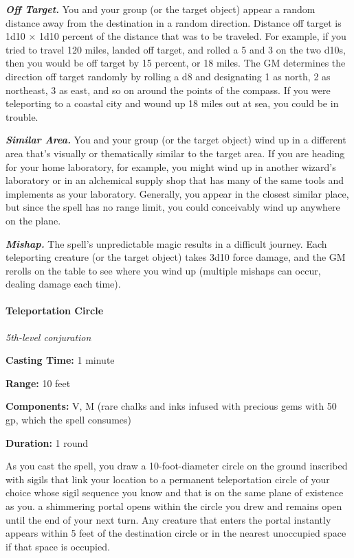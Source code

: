 \documentclass[
]{article}
\begin{document}
\emph{\textbf{Off Target.}} You and your group (or the target object)
appear a random distance away from the destination in a random
direction. Distance off target is 1d10 × 1d10 percent of the distance
that was to be traveled. For example, if you tried to travel 120 miles,
landed off target, and rolled a 5 and 3 on the two d10s, then you would
be off target by 15 percent, or 18 miles. The GM determines the
direction off target randomly by rolling a d8 and designating 1 as
north, 2 as northeast, 3 as east, and so on around the points of the
compass. If you were teleporting to a coastal city and wound up 18 miles
out at sea, you could be in trouble.

\emph{\textbf{Similar Area.}} You and your group (or the target object)
wind up in a different area that's visually or thematically similar to
the target area. If you are heading for your home laboratory, for
example, you might wind up in another wizard's laboratory or in an
alchemical supply shop that has many of the same tools and implements as
your laboratory. Generally, you appear in the closest similar place, but
since the spell has no range limit, you could conceivably wind up
anywhere on the plane.

\emph{\textbf{Mishap.}} The spell's unpredictable magic results in a
difficult journey. Each teleporting creature (or the target object)
takes 3d10 force damage, and the GM rerolls on the table to see where
you wind up (multiple mishaps can occur, dealing damage each time).

\hypertarget{teleportation-circle}{%
\paragraph{Teleportation Circle}\label{teleportation-circle}}

\emph{5th-level conjuration}

\textbf{Casting Time:} 1 minute

\textbf{Range:} 10 feet

\textbf{Components:} V, M (rare chalks and inks infused with precious
gems with 50 gp, which the spell consumes)

\textbf{Duration:} 1 round

As you cast the spell, you draw a 10-foot-diameter circle on the ground
inscribed with sigils that link your location to a permanent
teleportation circle of your choice whose sigil sequence you know and
that is on the same plane of existence as you. a shimmering portal opens
within the circle you drew and remains open until the end of your next
turn. Any creature that enters the portal instantly appears within 5
feet of the destination circle or in the nearest unoccupied space if
that space is occupied.
\end{document}
